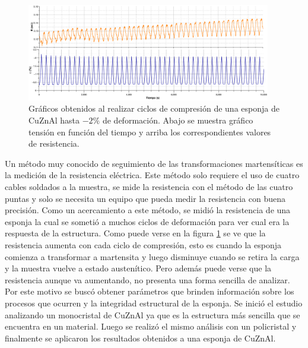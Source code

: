 \documentclass[a4paper,12pt,fleqn,twoside,openany]{book}
\begin{document}
 \begin{figure}[h]
 \centering
 \includegraphics[width=0.95\textwidth]{Img/Resultados/Resistencia/Ciclos.eps}
 \caption{Gráficos obtenidos al realizar ciclos de compresión de una esponja de CuZnAl hasta $-2\%$ de deformación. Abajo se muestra gráfico tensión en función del tiempo y arriba los correspondientes valores de resistencia. } 
 \label{fig:CiclosResistencia}
 \end{figure}


 
 
 
 
 Un método muy conocido de seguimiento de las transformaciones martensíticas es la medición de la resistencia eléctrica. Este método solo requiere el uso de cuatro cables soldados a la muestra, se mide la resistencia con el método de las cuatro puntas y solo se necesita un equipo que pueda medir la resistencia con buena precisión. Como un acercamiento a este método, se midió la resistencia de una esponja la cual se sometió a muchos ciclos de deformación para ver cual era la respuesta de la estructura. Como puede verse en la figura \ref{fig:CiclosResistencia} se ve que la resistencia aumenta con cada ciclo de compresión, esto es cuando la esponja comienza a transformar a martensita y luego disminuye cuando se retira la carga y la muestra vuelve a estado austenítico. Pero además puede verse que la resistencia aunque va aumentando, no presenta una forma sencilla de analizar. Por este motivo se buscó obtener parámetros que brinden información sobre los procesos que ocurren y la integridad estructural de la esponja. Se inició el estudio analizando un monocristal de CuZnAl ya que es la estructura más sencilla que se encuentra en un material. Luego se realizó el mismo análisis con un policristal y finalmente se aplicaron los resultados obtenidos a una esponja de CuZnAl.

\end{document}
